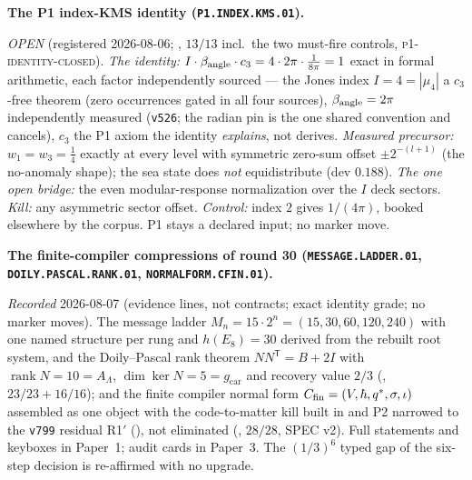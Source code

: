 \documentclass[11pt,a4paper]{article}
\newcommand{\cthree}{c_3}
\newcommand{\gcar}{g_{\mathrm{car}}}
\begin{document}
\par\smallskip\noindent\textbf{The P1 index-KMS identity
(\texttt{P1.INDEX.KMS.01}).}
{\sloppy
\emph{OPEN} (registered 2026-08-06;
, $13/13$ incl.\ the two must-fire
controls, \textsc{p1-identity-closed}).  \emph{The identity:}
$I\cdot\beta_{\rm angle}\cdot\cthree=4\cdot2\pi\cdot
\tfrac1{8\pi}=1$ exact in formal arithmetic, each factor
independently sourced --- the Jones index $I=4=|\mu_4|$ a
$\cthree$-free theorem (zero occurrences gated in all four
sources), $\beta_{\rm angle}=2\pi$ independently measured
(\texttt{v526}; the radian pin is the one shared convention and
cancels), $\cthree$ the P1 axiom the identity \emph{explains},
not derives.  \emph{Measured precursor:} $w_1=w_3=\tfrac14$
exactly at every level with symmetric zero-sum offset
$\pm2^{-(l+1)}$ (the no-anomaly shape); the sea state does
\emph{not} equidistribute (dev $0.188$).  \emph{The one open
bridge:} the even modular-response normalization over the $I$
deck sectors.  \emph{Kill:} any asymmetric sector offset.
\emph{Control:} index $2$ gives $1/(4\pi)$, booked elsewhere by
the corpus.  P1 stays a declared input; no marker move.\par}

\par\smallskip\noindent\textbf{The finite-compiler compressions
of round 30 (\texttt{MESSAGE.LADDER.01},
\texttt{DOILY.PASCAL.RANK.01}, \texttt{NORMALFORM.CFIN.01}).}
{\sloppy
\emph{Recorded} 2026-08-07 (evidence lines, not contracts; exact
identity grade; no marker moves).  The message ladder
$M_n = 15\cdot2^n = (15, 30, 60, 120, 240)$ with one named
structure per rung and $h(E_8) = 30$ derived from the rebuilt
root system, and the Doily--Pascal rank theorem
$NN^{\mathsf T} = B + 2I$ with $\operatorname{rank} N = 10 =
A_\Lambda$, $\dim\ker N = 5 = \gcar$ and recovery value $2/3$
(, $23/23 + 16/16$); and the
finite compiler normal form $C_{\rm fin} = (V, \hbar, q^{*},
\sigma, \iota)$ assembled as one object with the code-to-matter
kill built in and P2 narrowed to the \texttt{v799} residual
R1$'$ (\mC), not eliminated
(, $28/28$, SPEC v2).  Full
statements and keyboxes in Paper~1; audit cards in Paper~3.  The
$(1/3)^6$ typed gap of the six-step decision is re-affirmed with
no upgrade.\par}
\end{document}
